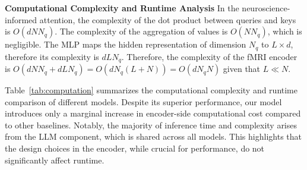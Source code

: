 \noindent\textbf{Computational Complexity and Runtime Analysis}
In the neuroscience-informed attention, the complexity of the dot product between queries and keys is $O(dNN_q)$. The complexity of the aggregation of values is $O(NN_q)$, which is negligible. The MLP maps the hidden representation of dimension $N_q$ to $L \times d$, therefore its complexity is $dLN_q$. Therefore, the complexity of the fMRI encoder is $O(dNN_q + dLN_q) = O(dN_q(L + N)) = O(dN_qN)$ given that $L \ll N$.

Table~\ref{tab:computation} summarizes the computational complexity and runtime comparison of different models. Despite its superior performance, our model introduces only a marginal increase in encoder-side computational cost compared to other baselines. Notably, the majority of inference time and complexity arises from the LLM component, which is shared across all models. This highlights that the design choices in the encoder, while crucial for performance, do not significantly affect runtime.


